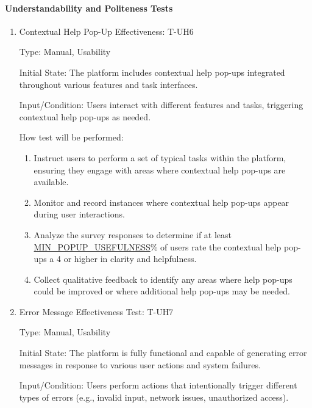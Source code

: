\documentclass[12pt, titlepage]{article}
\begin{document}
\paragraph{Understandability and Politeness Tests}
\begin{enumerate}

\item{Contextual Help Pop-Up Effectiveness: T-UH6\\}

Type: Manual, Usability

Initial State: The platform includes contextual help pop-ups integrated throughout various features and task interfaces.

Input/Condition: Users interact with different features and tasks, triggering contextual help pop-ups as needed.

How test will be performed:
\begin{enumerate}
    \item Instruct users to perform a set of typical tasks within the platform, ensuring they engage with areas where contextual help pop-ups are available.
    \item Monitor and record instances where contextual help pop-ups appear during user interactions.
    \item Analyze the survey responses to determine if at least \hyperref[MIN_POPUP_USEFULNESS]{MIN\_POPUP\_USEFULNESS}\% of users rate the contextual help pop-ups a 4 or higher in clarity and helpfulness.
    \item Collect qualitative feedback to identify any areas where help pop-ups could be improved or where additional help pop-ups may be needed.
\end{enumerate}

\item{Error Message Effectiveness Test: T-UH7\\}

Type: Manual, Usability

Initial State: The platform is fully functional and capable of generating error messages in response to various user actions and system failures.

Input/Condition: Users perform actions that intentionally trigger different types of errors (e.g., invalid input, network issues, unauthorized access).


\end{enumerate}
\end{document}
